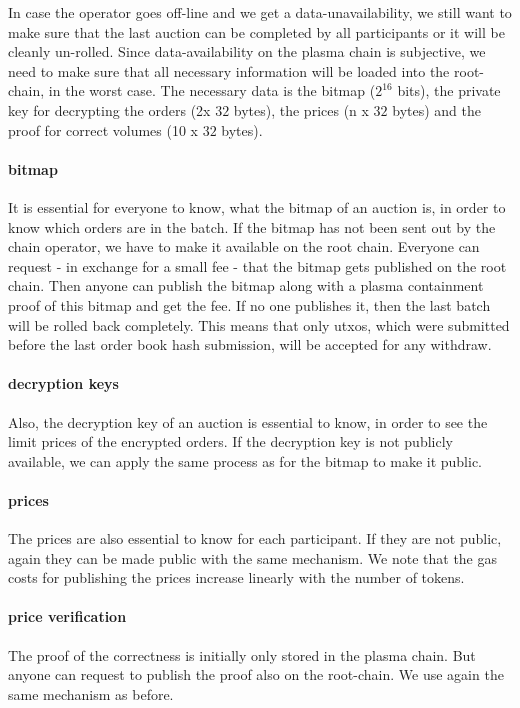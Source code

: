 \documentclass[11pt,parskip=full]{scrartcl}%
\begin{document}
\label{enforceAvailablity}
In case the operator goes off-line and we get a data-unavailability, we still want to make sure that the last auction can be completed by all participants or it will be cleanly un-rolled. 
Since data-availability on the plasma chain is subjective, we need to make sure that all necessary information will be loaded into the root-chain, in the worst case. 
The necessary data is the bitmap ($2^{16}$ bits), the private key for decrypting the orders (2x $32$ bytes), the prices (n x $32$ bytes) and the proof for correct volumes (10 x $32$ bytes).

\paragraph{bitmap}
It is essential for everyone to know, what the bitmap of an auction is, in order to know which orders are in the batch. 
If the bitmap has not been sent out by the chain operator, we have to make it available on the root chain. 
Everyone can request - in exchange for a small fee - that the bitmap gets published on the root chain. 
Then anyone can publish the bitmap along with a plasma containment proof of this bitmap and get the fee. 
If no one publishes it, then the last batch will be rolled back completely. 
This means that only utxos, which were submitted before the last order book hash submission, will be accepted for any withdraw. 

\paragraph{decryption keys}
Also, the decryption key of an auction is essential to know, in order to see the limit prices of the encrypted orders. 
If the decryption key is not publicly available, we can apply the same process as for the bitmap to make it public. 

\paragraph{prices}
The prices are also essential to know for each participant. 
If they are not public, again they can be made public with the same mechanism. 
We note that the gas costs for publishing the prices increase linearly with the number of tokens. 

\paragraph{price verification}
The proof of the correctness is initially only stored in the plasma chain. 
But anyone can request to publish the proof also on the root-chain. 
We use again the same mechanism as before. 
\end{document}
